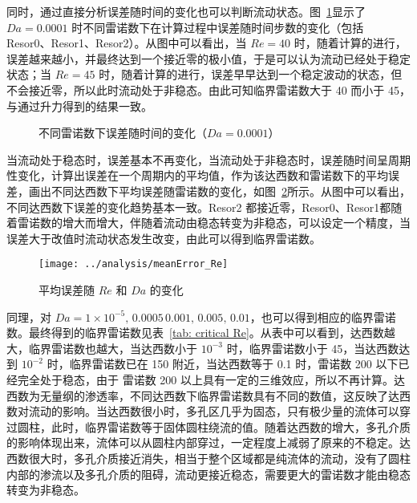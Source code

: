 同时，通过直接分析误差随时间的变化也可以判断流动状态。图~\ref{fig: resd}显示了 $Da=0.0001$ 时不同雷诺数下在计算过程中误差随时间步数的变化（包括 Resor0、Resor1、Resor2）。从图中可以看出，当 $Re=40$ 时，随着计算的进行，误差越来越小，并最终达到一个接近零的极小值，于是可以认为流动已经处于稳定状态；当 $Re=45$ 时，随着计算的进行，误差早早达到一个稳定波动的状态，但不会接近零，所以此时流动处于非稳态。由此可知临界雷诺数大于 40 而小于 45，与通过升力得到的结果一致。

\begin{figure}
	\centering
	\begin{minipage}{\textwidth}
		\centering
	\end{minipage}
	\centering
	\begin{minipage}{\textwidth}
		\centering
	\end{minipage}
	\caption{不同雷诺数下误差随时间的变化（$Da=0.0001$）}
	\label{fig: resd}
\end{figure}

当流动处于稳态时，误差基本不再变化，当流动处于非稳态时，误差随时间呈周期性变化，计算出误差在一个周期内的平均值，作为该达西数和雷诺数下的平均误差，画出不同达西数下平均误差随雷诺数的变化，如图~\ref{fig: error}所示。从图中可以看出，不同达西数下误差的变化趋势基本一致。Resor2 都接近零，Resor0、Resor1都随着雷诺数的增大而增大，伴随着流动由稳态转变为非稳态，可以设定一个精度，当误差大于改值时流动状态发生改变，由此可以得到临界雷诺数。

\begin{figure}
	\centering
	\texttt{[image: ../analysis/meanError\_Re]}
	\caption{平均误差随 $Re$ 和 $Da$ 的变化}
	\label{fig: error}
\end{figure}

同理，对 $Da=1\times 10^{-5},\,0.0005\,0.001,\,0.005,\,0.01$，也可以得到相应的临界雷诺数。最终得到的临界雷诺数见表~\ref{tab: critical Re}。从表中可以看到，达西数越大，临界雷诺数也越大，当达西数小于 $10^{-3}$ 时，临界雷诺数小于 45，当达西数达到 $10^{-2}$ 时，临界雷诺数已在 150 附近，当达西数等于 0.1 时，雷诺数 200 以下已经完全处于稳态，由于 雷诺数 200 以上具有一定的三维效应，所以不再计算。达西数为无量纲的渗透率，不同达西数下临界雷诺数具有不同的数值，这反映了达西数对流动的影响。当达西数很小时，多孔区几乎为固态，只有极少量的流体可以穿过圆柱，此时，临界雷诺数等于固体圆柱绕流的值。随着达西数的增大，多孔介质的影响体现出来，流体可以从圆柱内部穿过，一定程度上减弱了原来的不稳定。达西数很大时，多孔介质接近消失，相当于整个区域都是纯流体的流动，没有了圆柱内部的渗流以及多孔介质的阻碍，流动更接近稳态，需要更大的雷诺数才能由稳态转变为非稳态。

